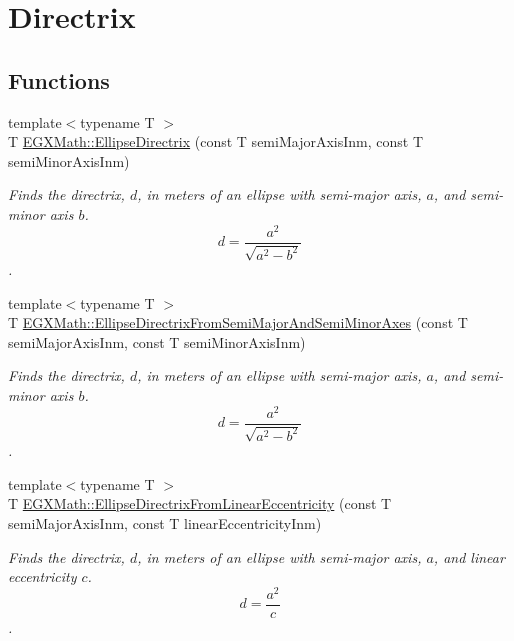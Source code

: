 \hypertarget{group___e_g_x_math-_geometry-2_d-_ellipse-_directrix}{}\section{Directrix}
\label{group___e_g_x_math-_geometry-2_d-_ellipse-_directrix}
\subsection*{Functions}
\begin{DoxyCompactItemize}
\item 
{\footnotesize template$<$typename T $>$ }\\T \mbox{\hyperlink{group___e_g_x_math-_geometry-2_d-_ellipse-_directrix_gace8f72a8efbc9c18d3eb689151405106}{E\+G\+X\+Math\+::\+Ellipse\+Directrix}} (const T semi\+Major\+Axis\+Inm, const T semi\+Minor\+Axis\+Inm)
\begin{DoxyCompactList}\small\item\em Finds the directrix, $d$, in meters of an ellipse with semi-\/major axis, $a$, and semi-\/minor axis $b$. \[ d=\frac{a^2}{\sqrt{a^2-b^2}} \]. \end{DoxyCompactList}\item 
{\footnotesize template$<$typename T $>$ }\\T \mbox{\hyperlink{group___e_g_x_math-_geometry-2_d-_ellipse-_directrix_ga5e7a411cd0af17a30bae03613b4a675d}{E\+G\+X\+Math\+::\+Ellipse\+Directrix\+From\+Semi\+Major\+And\+Semi\+Minor\+Axes}} (const T semi\+Major\+Axis\+Inm, const T semi\+Minor\+Axis\+Inm)
\begin{DoxyCompactList}\small\item\em Finds the directrix, $d$, in meters of an ellipse with semi-\/major axis, $a$, and semi-\/minor axis $b$. \[ d=\frac{a^2}{\sqrt{a^2-b^2}} \]. \end{DoxyCompactList}\item 
{\footnotesize template$<$typename T $>$ }\\T \mbox{\hyperlink{group___e_g_x_math-_geometry-2_d-_ellipse-_directrix_gaa496c6b5f9717e7ce731dd374f5d0ae8}{E\+G\+X\+Math\+::\+Ellipse\+Directrix\+From\+Linear\+Eccentricity}} (const T semi\+Major\+Axis\+Inm, const T linear\+Eccentricity\+Inm)
\begin{DoxyCompactList}\small\item\em Finds the directrix, $d$, in meters of an ellipse with semi-\/major axis, $a$, and linear eccentricity $c$. \[ d=\frac{a^2}{c} \]. \end{DoxyCompactList}\end{DoxyCompactItemize}


